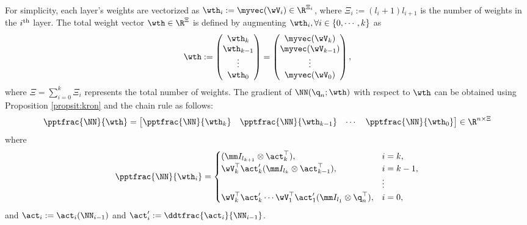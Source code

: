 \documentclass[journal]{IEEEtran}
\begin{document}
For simplicity, each layer's weights are vectorized as $\wth_i:=\myvec(\wV_i)\in\R^{\Xi_i}$, where $\Xi_i:= (l_i+1)l_{i+1}$ is the number of weights in the $i\textsuperscript{th}$ layer. 
The total weight vector $\wth\in\R^{\Xi}$ is defined by augmenting $\wth_i, \forall i\in \{0,\cdots,k\}$ as 
\begin{equation}
    \wth := 
    \begin{pmatrix}
        \wth_k\\
        \wth_{k-1}\\
        \vdots\\
        \wth_0
    \end{pmatrix}
    =
    \begin{pmatrix}
        \myvec(\wV_k)\\
        \myvec(\wV_{k-1})\\
        \vdots\\
        \myvec(\wV_0)
    \end{pmatrix},
\end{equation}
where $\Xi={\sum_{i=0}^{k} \Xi_i}$ represents the total number of weights. 
The gradient of $ \NN({\q}_n;\wth)$ with respect to $\wth$ can be obtained using Proposition \ref{propsit:kron} and the chain rule as follows:
\begin{equation}
    \pptfrac{\NN}{\wth}=
    \begin{bmatrix}
        \pptfrac{\NN}{\wth_k}&
        \pptfrac{\NN}{\wth_{k-1}}&
    \cdots &
        \pptfrac{\NN}{\wth_0}
    \end{bmatrix}
    \in\R^{n \times \Xi}
    \label{eq:gradient:phi}
\end{equation}
where
\begin{equation}
    \pptfrac{\NN}{\wth_i} = 
    \begin{cases}
        (
            \mm I_{l_{k+1}}
            \otimes 
            \act_{k}^\top  
        )
        , 
        &
        i=k
        ,
        \\
        \wV_k^\top\act_{k}' 
        (
            \mm I_{l_{k}}
            \otimes  
            \act_{k-1}^\top  
        )
        , 
        & 
        i=k-1
        ,
        \\
        &
        \vdots 
        \\
        \wV_k^\top\act'_{k} 
        \cdots 
        \wV_1^\top\act_1' 
        (
            \mm I_{l_1}
            \otimes 
            {\q}_n^\top  
        )
        , 
        &
        i = 0
        ,
    \end{cases}
    \label{eq:NN:grad}
\end{equation}
and $\act_i:= \act_i(\NN_{i-1})$ and $\act_i':= \ddtfrac{\act_i}{\NN_{i-1}}$.
\end{document}
